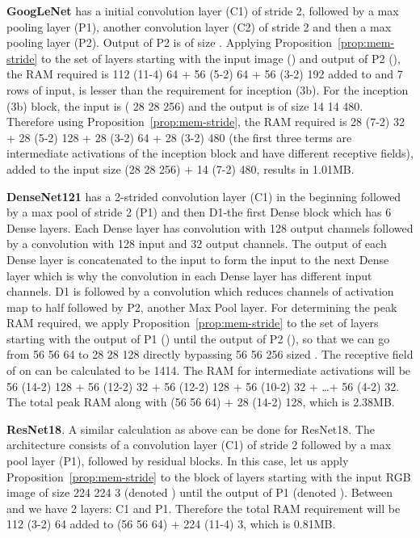 \documentclass[10pt]{article}
\begin{document}
\textbf{GoogLeNet} has a initial convolution layer (C1) of stride 2,
followed by a max pooling layer (P1), another convolution layer (C2)
of stride 2 and then a max pooling layer (P2). Output of P2 is of size
. Applying
Proposition~\ref{prop:mem-stride} to the set of layers starting with
the input image () and output of P2 (), the RAM required is 112
 (11-4)  64 + 56  (5-2)  64 + 56
 (3-2)  192 added to  and 7 rows of input, is
lesser than the requirement for inception (3b). For the inception (3b)
block, the input is ( 28  28  256) and the output is
of size 14  14  480. Therefore using
Proposition~\ref{prop:mem-stride}, the RAM required is 28 
(7-2)  32 + 28  (5-2)  128 + 28  (3-2)
 64 + 28  (3-2)  480 (the first three terms
are intermediate activations of the inception block and have different
receptive fields), added to the input size (28  28 
256) + 14  (7-2)  480, results in 1.01MB.


\textbf{DenseNet121} has a 2-strided convolution layer (C1) in the
beginning followed by a max pool of stride 2 (P1) and then D1-the
first Dense block which has 6 Dense layers. Each Dense layer has
 convolution with 128 output channels followed by a
 convolution with 128 input and 32 output channels. The
output of each Dense layer is concatenated to the input to form the
input to the next Dense layer which is why the  convolution
in each Dense layer has different input channels. D1 is followed by a
 convolution which reduces channels of activation map to
half followed by P2, another Max Pool layer. For determining the peak
RAM required, we apply Proposition~\ref{prop:mem-stride} to the set of
layers starting with the output of P1 () until the output of P2
(), so that we can go from 56  56  64 to 28
 28  128 directly bypassing 56  56 
256 sized . The receptive field of  on  can be
calculated to be 1414. The RAM for intermediate activations
will be 56  (14-2)  128 + 56  (12-2) 
32 + 56  (12-2)  128 + 56  (10-2)  32
+ \dots + 56  (4-2)  32. The total peak RAM along with
 (56 56  64) + 28  (14-2)  128,
which is 2.38MB.





\textbf{ResNet18}. A similar calculation as above can be done for
ResNet18. The architecture consists of a convolution layer (C1) of
stride 2 followed by a max pool layer (P1), followed by residual
blocks. In this case, let us apply Proposition~\ref{prop:mem-stride}
to the block of layers starting with the input RGB image of size 224
 224  3 (denoted ) until the output of P1 (denoted
). Between  and  we have 2 layers: C1 and P1. Therefore the
total RAM requirement will be 112  (3-2)  64 added to
 (56  56  64) + 224  (11-4)  3,
which is 0.81MB.
\end{document}
